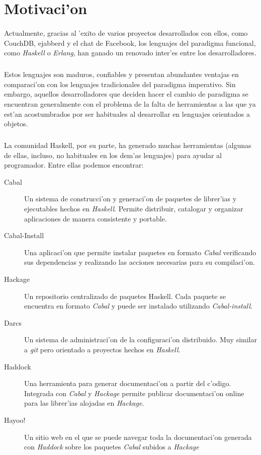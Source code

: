 \documentclass[a4paper]{article}
\begin{document}
\newpage
\tableofcontents

\newpage
\section{Motivaci'on}

\paragraph{}Actualmente, gracias al 'exito de varios proyectos desarrollados con ellos, como CouchDB, ejabberd y el chat de Facebook, los lenguajes del paradigma funcional, como \textit{Haskell} o \textit{Erlang}, han ganado un renovado inter'es entre los desarrolladores.
\subparagraph{}Estos lenguajes son maduros, confiables y presentan abundantes ventajas en comparaci'on con los lenguajes tradicionales del paradigma imperativo.  Sin embargo, aquellos desarrolladores que deciden hacer el cambio de paradigma se encuentran generalmente con el problema de la falta de herramientas a las que ya est'an acostumbrados por ser habituales al desarrollar en lenguajes orientados a objetos.
\subparagraph{}La comunidad Haskell, por su parte, ha generado muchas herramientas (algunas de ellas, incluso, no habituales en los dem'as lenguajes) para ayudar al programador.  Entre ellas podemos encontrar:
\begin{description}
\item[Cabal] Un sistema de construcci'on y generaci'on de paquetes de librer'ias y ejecutables hechos en \textit{Haskell}.  Permite distribuir, catalogar y organizar aplicaciones de manera consistente y portable.
\item[Cabal-Install] Una aplicaci'on que permite instalar paquetes en formato \textsl{Cabal} verificando sus dependencias y realizando las acciones necesarias para su compilaci'on.
\item[Hackage] Un repositorio centralizado de paquetes Haskell.  Cada paquete se encuentra en formato \textsl{Cabal} y puede ser instalado utilizando \textsl{Cabal-install}.
\item[Darcs] Un sistema de administraci'on de la configuraci'on distribuido.  Muy similar a \textsl{git} pero orientado a proyectos hechos en \textit{Haskell}.
\item[Haddock] Una herramienta para generar documentaci'on a partir del c'odigo.  Integrada con \textsl{Cabal} y \textsl{Hackage} permite publicar documentaci'on online para las librer'ias alojadas en \textsl{Hackage}.
\item[Hayoo!] Un sitio web en el que se puede navegar toda la documentaci'on generada con \textsl{Haddock} sobre los paquetes \textsl{Cabal} subidos a \textsl{Hackage}
\end{description}
\end{document}
